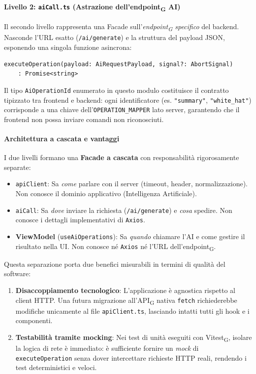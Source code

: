 \documentclass[11pt,a4paper]{article}
\newcommand{\gls}[1]{#1\textsubscript{G}}
\begin{document}
\paragraph{Livello 2: \texttt{aiCall.ts} (Astrazione dell'\gls{endpoint} AI)}
Il secondo livello rappresenta una Facade sull'\textit{\gls{endpoint} specifico} del backend. Nasconde l'URL esatto (\texttt{/ai/generate}) e la struttura del payload JSON, esponendo una singola funzione asincrona:

\begin{verbatim}
executeOperation(payload: AiRequestPayload, signal?: AbortSignal)
    : Promise<string>
\end{verbatim}

Il tipo \texttt{AiOperationId} enumerato in questo modulo costituisce il contratto tipizzato tra frontend e backend: ogni identificatore (es. \texttt{"summary"}, \texttt{"white\_hat"}) corrisponde a una chiave dell'\texttt{OPERATION\_MAPPER} lato server, garantendo che il frontend non possa inviare comandi non riconosciuti.

\paragraph{Architettura a cascata e vantaggi}
I due livelli formano una \textbf{Facade a cascata} con responsabilità rigorosamente separate:
\begin{itemize}
    \item \texttt{apiClient}: Sa \textit{come} parlare con il server (timeout, header, normalizzazione). Non conosce il dominio applicativo (Intelligenza Artificiale).
    \item \texttt{aiCall}: Sa \textit{dove} inviare la richiesta (\texttt{/ai/generate}) e \textit{cosa} spedire. Non conosce i dettagli implementativi di \texttt{Axios}.
    \item \textbf{ViewModel} (\texttt{useAiOperations}): Sa \textit{quando} chiamare l'AI e come gestire il risultato nella UI. Non conosce né \texttt{Axios} né l'URL dell'\gls{endpoint}.
\end{itemize}

Questa separazione porta due benefici misurabili in termini di qualità del software:
\begin{enumerate}
    \item \textbf{Disaccoppiamento tecnologico}: L'applicazione è agnostica rispetto al client HTTP. Una futura migrazione all'\gls{API} nativa \texttt{fetch} richiederebbe modifiche unicamente al file \texttt{apiClient.ts}, lasciando intatti tutti gli hook e i componenti.
    \item \textbf{Testabilità tramite mocking}: Nei test di unità eseguiti con \gls{Vitest}, isolare la logica di rete è immediato: è sufficiente fornire un \textit{mock} di \texttt{executeOperation} senza dover intercettare richieste HTTP reali, rendendo i test deterministici e veloci.
\end{enumerate}
\end{document}
